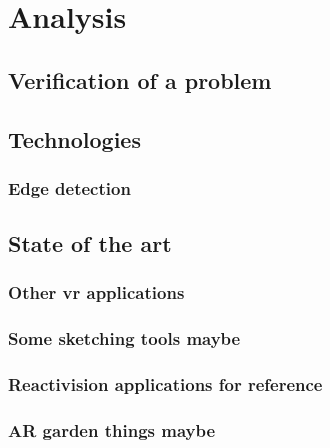 \chapter{Analysis}
	
	
	\section{Verification of a problem}\label{sec:verification}
	\section{Technologies}\label{sec:technologies}
		\subsection{Edge detection}
           

    \section{State of the art}\label{sec:SOTA}
		\subsection{Other vr applications}
		\subsection{Some sketching tools maybe}
		\subsection{Reactivision applications for reference}
		\subsection{AR garden things maybe}